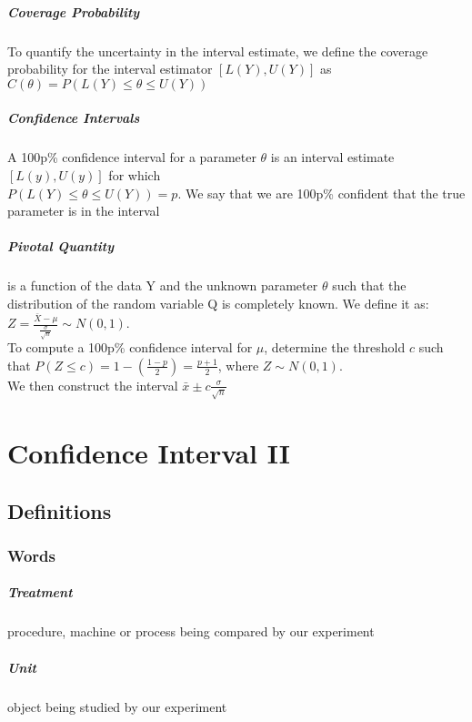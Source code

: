 \documentclass[12pt]{report}
\begin{document}
    \paragraph{Coverage Probability} To quantify the uncertainty in the
    interval estimate, we define the coverage probability for the interval
    estimator $[L(Y), U(Y)]$ as \\
    $C(\theta) = P(L(Y) \leq \theta \leq U(Y))$

    \paragraph{Confidence Intervals} A 100p\% confidence interval for a
    parameter $\theta$ is an interval estimate $[L(y), U(y)]$ for which\\
    $P(L(Y) \leq \theta \leq U(Y)) = p$. We say that we are 100p\% confident
    that the true parameter is in the interval

    \paragraph{Pivotal Quantity} is a function of the data Y and the unknown
    parameter $\theta$ such that the distribution of the random variable Q is
    completely known.  We define it as: $Z = \frac{\bar{X} -
    \mu}{\frac{\sigma}{\sqrt{n}}} \sim N(0, 1)$. \\
    To compute a 100p\% confidence interval for $\mu$, determine the threshold
    $c$ such that $P(Z \leq c) = 1 - (\frac{1-p}{2}) = \frac{p+1}{2}$, where $Z
    \sim N(0, 1)$.\\
    We then construct the interval $\bar{x} \pm c\frac{\sigma}{\sqrt{n}}$

\chapter{Confidence Interval II}
  \section{Definitions}
    \subsection{Words}
      \paragraph{Treatment} procedure, machine or process being compared by our experiment
      \paragraph{Unit} object being studied by our experiment
\end{document}

